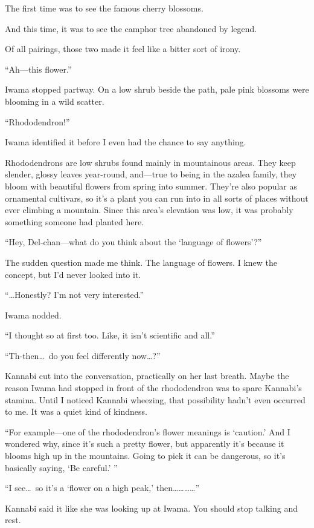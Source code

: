 \documentclass[
    a4paper,
    12pt,
    twoside,
    openany,
    UTF8,
    fontset=windows
]{ctexbook}
\begin{document}
The first time was to see the famous cherry blossoms.

And this time, it was to see the camphor tree abandoned by legend.

Of all pairings, those two made it feel like a bitter sort of irony.

``Ah---this flower.''

Iwama stopped partway. On a low shrub beside the path, pale pink blossoms were blooming in a wild scatter.

``Rhododendron!''

Iwama identified it before I even had the chance to say anything.

Rhododendrons are low shrubs found mainly in mountainous areas. They keep slender, glossy leaves year-round, and---true to being in the azalea family, they bloom with beautiful flowers from spring into summer. They're also popular as ornamental cultivars, so it's a plant you can run into in all sorts of places without ever climbing a mountain. Since this area's elevation was low, it was probably something someone had planted here.

``Hey, Del-chan---what do you think about the `language of flowers'?''

The sudden question made me think. The language of flowers. I knew the concept, but I'd never looked into it.

``\dots Honestly? I'm not very interested.''

Iwama nodded.

``I thought so at first too. Like, it isn't scientific and all.''

``Th-then\dots\ do you feel differently now\dots?''

Kannabi cut into the conversation, practically on her last breath. Maybe the reason Iwama had stopped in front of the rhododendron was to spare Kannabi's stamina. Until I noticed Kannabi wheezing, that possibility hadn't even occurred to me. It was a quiet kind of kindness.

``For example---one of the rhododendron's flower meanings is `caution.' And I wondered why, since it's such a pretty flower, but apparently it's because it blooms high up in the mountains. Going to pick it can be dangerous, so it's basically saying, `Be careful.' ''

``I see\dots\ so it's a `flower on a high peak,' then\dots\dots\dots\dots''

Kannabi said it like she was looking up at Iwama. You should stop talking and rest.
\end{document}

